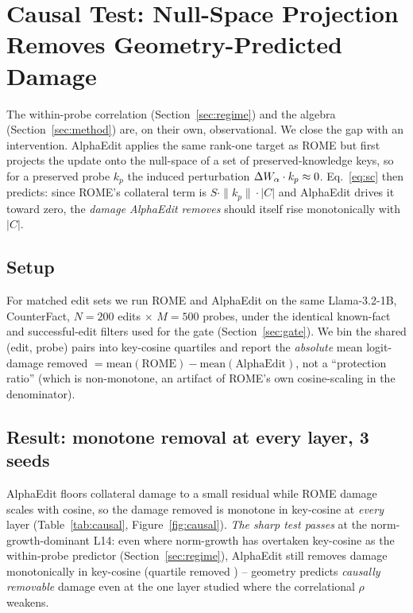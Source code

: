 \section{Causal Test: Null-Space Projection Removes Geometry-Predicted Damage}
\label{sec:causal}

The within-probe correlation (Section~\ref{sec:regime}) and the \SxC{}
algebra (Section~\ref{sec:method}) are, on their own, observational. We
close the gap with an intervention. AlphaEdit \citep{fang2025alphaedit}
applies the same rank-one target as ROME but first projects the update onto
the null-space of a set of preserved-knowledge keys, so for a preserved
probe $k_p$ the induced perturbation $\Delta W_\alpha\cdot k_p\approx 0$.
Eq.~\ref{eq:sc} then predicts: since ROME's collateral term is
$S\cdot\|k_p\|\cdot|C|$ and AlphaEdit drives it toward zero, the
\emph{damage AlphaEdit removes} should itself rise monotonically with $|C|$.

\subsection{Setup}
For matched edit sets we run ROME and AlphaEdit on the same Llama-3.2-1B,
CounterFact, $N{=}200$ edits $\times$ $M{=}500$ probes, under the identical
known-fact and successful-edit filters used for the gate (Section~\ref{sec:gate}).
We bin the shared (edit, probe) pairs into key-cosine quartiles and report
the \emph{absolute} mean logit-damage removed $=\text{mean}(\text{ROME})-
\text{mean}(\text{AlphaEdit})$, not a ``protection ratio'' (which is
non-monotone, an artifact of ROME's own cosine-scaling in the denominator).

\subsection{Result: monotone removal at every layer, 3 seeds}
AlphaEdit floors collateral damage to a small residual while ROME damage
scales with cosine, so the damage removed is monotone in key-cosine at
\emph{every} layer (Table~\ref{tab:causal}, Figure~\ref{fig:causal}).
\emph{The sharp test passes} at the norm-growth-dominant L14: even where
norm-growth has overtaken key-cosine as the within-probe predictor
(Section~\ref{sec:regime}), AlphaEdit still removes damage monotonically in
key-cosine (quartile removed \cbcQuartLfourteen{}) -- geometry predicts
\emph{causally removable} damage even at the one layer studied where the
correlational $\rho$ weakens.

